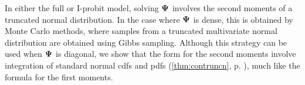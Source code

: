 \vspace{-1em}
In either the full or I-probit model, solving ${\bm\Psi}$ involves the second moments of a truncated normal distribution.
In the case where ${\bm\Psi}$ is dense, this is obtained by Monte Carlo methods, where samples from a truncated multivariate normal distribution are obtained using Gibbs sampling.
Although this strategy can be used when ${\bm\Psi}$ is diagonal, we show that the form for the second moments  involve integration of standard normal cdfs and pdfs (\cref{thm:contruncn}, p. \pageref{thm:contruncn}), much like the formula for the first moments.
